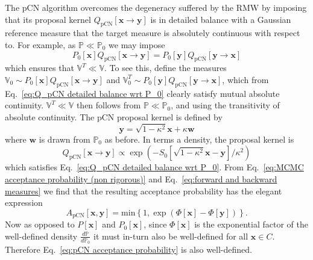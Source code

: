 The pCN algorithm overcomes the degeneracy suffered by the RMW by imposing that its proposal kernel $Q_\text{pCN}[\mathbf{x} \to \mathbf{y}]$ is in detailed balance with a Gaussian reference measure that the target measure is absolutely continuous with respect to. For example, as $\mathbb{P} \ll \mathbb{P}_0$ we may impose
\begin{equation} \label{eq:Q_pCN detailed balance wrt P_0}
	P_0[\mathbf{x}] Q_\text{pCN}[\mathbf{x} \to \mathbf{y}] = P_0[\mathbf{y}] Q_\text{pCN}[\mathbf{y} \to \mathbf{x}]
\end{equation}
which ensures that $\mathbb{V}^T \ll \mathbb{V}$. To see this, define the measures $\mathbb{V}_0 \sim P_0[\mathbf{x}] Q_\text{pCN}[\mathbf{x} \to \mathbf{y}]$ and $\mathbb{V}_0^T \sim P_0[\mathbf{y}] Q_\text{pCN}[\mathbf{y} \to \mathbf{x}]$, which from Eq.~\ref{eq:Q_pCN detailed balance wrt P_0} clearly satisfy mutual absolute continuity. $\mathbb{V}^T \ll \mathbb{V}$ then follows from $\mathbb{P} \ll \mathbb{P}_0$, and using the transitivity of absolute continuity. The pCN proposal kernel is defined by
\begin{equation}
	\mathbf{y} = \sqrt{1 - \kappa^2} \mathbf{x} + \kappa \mathbf{w}
\end{equation}
where $\mathbf{w}$ is drawn from $\mathbb{P}_0$ as before. In terms a density, the proposal kernel is
\begin{equation}  \label{eq:pCN transition kernel}
	Q_\text{pCN}[\mathbf{x} \to \mathbf{y}] \propto \exp ( - S_0[ \sqrt{1 - \kappa^2} \mathbf{x} - \mathbf{y}] / \kappa^2 ) 
\end{equation}
which satisfies Eq.~\ref{eq:Q_pCN detailed balance wrt P_0}. From Eq.~\ref{eq:MCMC acceptance probability (non rigorous)} and Eq.~\ref{eq:forward and backward measures} we find that the resulting acceptance probability has the elegant expression
\begin{equation} \label{eq:pCN acceptance probability}
A_\text{pCN}[\mathbf{x}, \mathbf{y}] = \text{min} \left\{ 1, 
\exp \left( \Phi[\mathbf{x}] - \Phi[\mathbf{y}] \right)
\right\}.
\end{equation}
Now as opposed to $P[\mathbf{x}]$ and $P_0[\mathbf{x}]$, since $\Phi[\mathbf{x}]$ is the exponential factor of the well-defined density $\frac{d \mathbb{P}}{d \mathbb{P}_0}$ it must in-turn also be well-defined for all $\mathbf{x} \in C$. Therefore Eq.~\ref{eq:pCN acceptance probability} is also well-defined.


